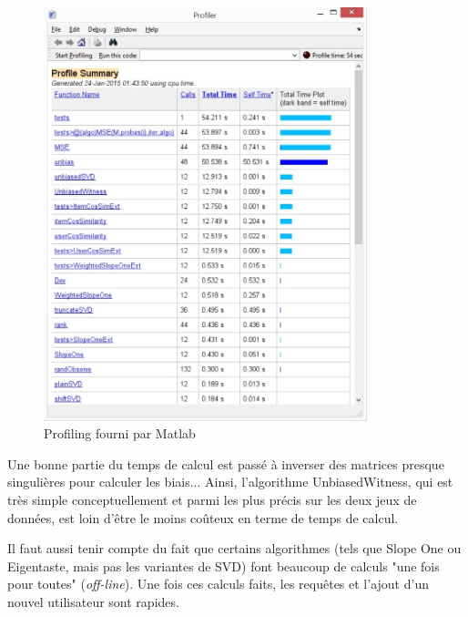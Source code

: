 \documentclass[11pt, openany, a4paper]{article}
\begin{document}
		\begin{figure}[ht!]
			\centering
			\includegraphics[height=120mm]{times.jpg}
			\caption{Profiling fourni par Matlab}
		\end{figure}
		

		Une bonne partie du temps de calcul est passé à inverser des matrices presque singulières pour calculer les biais... Ainsi, l'algorithme UnbiasedWitness, qui est très simple conceptuellement et parmi les plus précis sur les deux jeux de données, est loin d'être le moins coûteux en terme de temps de calcul.
				
		Il faut aussi tenir compte du fait que certains algorithmes (tels que Slope One ou Eigentaste, mais pas les variantes de SVD) font beaucoup de calculs "une fois pour toutes" (\emph{off-line}). Une fois ces calculs faits, les requêtes et l'ajout d'un nouvel utilisateur sont rapides. 
		


\end{document}
